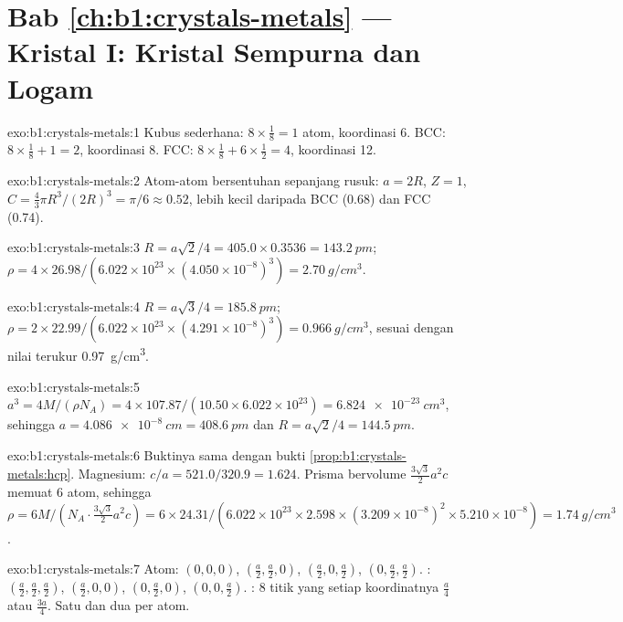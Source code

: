 \section*{Bab \ref{ch:b1:crystals-metals} --- Kristal I: Kristal Sempurna dan Logam}

\begin{solution}{exo:b1:crystals-metals:1}
Kubus sederhana: $8 \times \frac18 = 1$ atom, koordinasi 6. BCC: $8 \times
\frac18 + 1 = 2$, koordinasi 8. FCC: $8 \times \frac18 + 6 \times
\frac12 = 4$, koordinasi 12.
\end{solution}

\begin{solution}{exo:b1:crystals-metals:2}
Atom-atom bersentuhan sepanjang rusuk: $a = 2R$, $Z = 1$, $C = \frac43\pi R^3/(2R)^3
= \pi/6 \approx 0.52$, lebih kecil daripada BCC (0.68) dan FCC (0.74).
\end{solution}

\begin{solution}{exo:b1:crystals-metals:3}
$R = a\sqrt2/4 = 405.0 \times 0.3536 = \qty{143.2}{pm}$;
$\rho = 4 \times 26.98/(6.022 \times 10^{23} \times (4.050 \times
10^{-8})^3) = \qty{2.70}{g/cm^3}$.
\end{solution}

\begin{solution}{exo:b1:crystals-metals:4}
$R = a\sqrt3/4 = \qty{185.8}{pm}$; $\rho = 2 \times 22.99/(6.022 \times
10^{23} \times (4.291 \times 10^{-8})^3) = \qty{0.966}{g/cm^3}$, sesuai
dengan nilai terukur \qty{0.97}{g/cm^3}.
\end{solution}

\begin{solution}{exo:b1:crystals-metals:5}
$a^3 = 4M/(\rho N_A) = 4 \times 107.87/(10.50 \times 6.022 \times 10^{23}) =
\qty{6.824e-23}{cm^3}$, sehingga $a = \qty{4.086e-8}{cm} = \qty{408.6}{pm}$
dan $R = a\sqrt2/4 = \qty{144.5}{pm}$.
\end{solution}

\begin{solution}{exo:b1:crystals-metals:6}
Buktinya sama dengan bukti \cref{prop:b1:crystals-metals:hcp}. Magnesium:
$c/a = 521.0/320.9 = 1.624$. Prisma bervolume
$\frac{3\sqrt3}{2}a^2c$ memuat 6 atom, sehingga $\rho = 6M/(N_A \cdot
\frac{3\sqrt3}{2}a^2c) = 6 \times 24.31/(6.022 \times 10^{23} \times
2.598 \times (3.209 \times 10^{-8})^2 \times 5.210 \times 10^{-8}) =
\qty{1.74}{g/cm^3}$.
\end{solution}

\begin{solution}{exo:b1:crystals-metals:7}
Atom: $(0,0,0)$, $(\frac a2,\frac a2,0)$, $(\frac a2,0,\frac a2)$,
$(0,\frac a2,\frac a2)$. : $(\frac a2,\frac a2,\frac a2)$,
$(\frac a2,0,0)$, $(0,\frac a2,0)$, $(0,0,\frac a2)$. :
8 titik yang setiap koordinatnya $\frac a4$ atau $\frac{3a}{4}$. Satu
 dan dua  per atom.
\end{solution}

